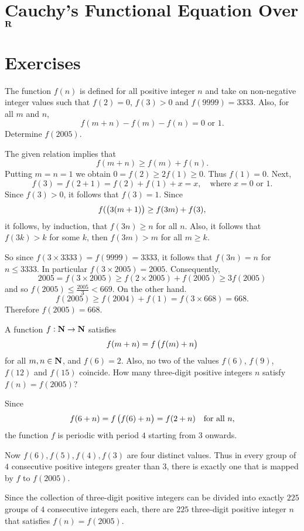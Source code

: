 \section{Cauchy's Functional Equation Over $\mathbf R$}
\pagebreak

\section*{Exercises}
\begin{prbm}
The function $f(n)$ is defined for all positive integer $n$ and take on non-negative integer values such that $f(2)=0$, $f(3)>0$ and $f(9999)=3333$. Also, for all $m$ and $n$,
\[ f(m+n)-f(m)-f(n)=0 \text{ or } 1. \]
Determine $f(2005)$.
\end{prbm}

\begin{solution}
The given relation implies that 
\[ f(m+n)\ge f(m)+f(n). \]
Putting $m=n=1$ we obtain $0=f(2)\ge2f(1)\ge0$. Thus $f(1)=0$. Next,
\[ f(3)=f(2+1)=f(2)+f(1)+x=x, \quad \text{where $x=0$ or $1$}. \]
Since $f(3)>0$, it follows that $f(3)=1$. Since
\[ f(\left(3(m+1)\right)\ge f(3m)+f(3), \]
it follows, by induction, that $f(3n)\ge n$ for all $n$. Also, it follows that $f(3k)>k$ for some $k$, then $f(3m)>m$ for all $m\ge k$.

So since $f(3\times3333)=f(9999)=3333$, it follows that $f(3n)=n$ for $n\le 3333$. In particular $f(3\times2005)=2005$. Consequently, 
\[ 2005=f(3\times2005)\ge f(2\times2005)+f(2005)\ge3f(2005) \]
and so $f(2005)\le\frac{2005}{3}<669$. On the other hand.
\[ f(2005)\ge f(2004)+f(1)=f(3\times668)=668. \]
Therefore $f(2005)=668$.
\end{solution}

\begin{prbm}
A function $f:\mathbf N\to\mathbf N$ satisfies
\[ f(m+n)=f\left(f(m)+n\right) \]
for all $m,n\in\mathbf N$, and $f(6)=2$. Also, no two of the values $f(6)$, $f(9)$, $f(12)$ and $f(15)$ coincide. How many three-digit positive integers $n$ satisfy $f(n)=f(2005)$?
\end{prbm}

\begin{solution}
Since 
\[ f(6+n)=f\left(f(6)+n\right)=f(2+n) \quad \text{for all $n$}, \]
the function $f$ is periodic with period $4$ starting from $3$ onwards.

Now $f(6),f(5),f(4),f(3)$ are four distinct values. Thus in every group of $4$ consecutive positive integers greater than 3, there is exactly one that is mapped by $f$ to $f(2005)$.

Since the collection of three-digit positive integers can be divided into exactly $225$ groups of $4$ consecutive integers each, there are $225$ three-digit positive integer $n$ that satisfies $f(n)=f(2005)$.
\end{solution}

